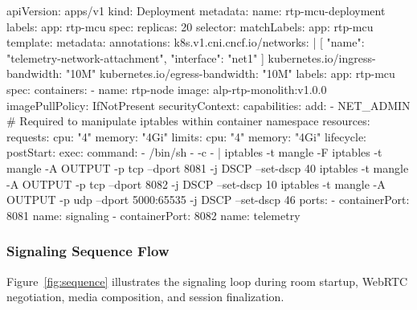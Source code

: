 \documentclass{article}
\let\originalfootnotesize\footnotesize
\let\oldverbatim\verbatim
\let\oldendverbatim\endverbatim
\renewenvironment{verbatim}{\originalfootnotesize\oldverbatim}{\oldendverbatim}
\begin{document}
\begin{verbatim}
apiVersion: apps/v1
kind: Deployment
metadata:
  name: rtp-mcu-deployment
  labels:
    app: rtp-mcu
spec:
  replicas: 20
  selector:
    matchLabels:
      app: rtp-mcu
  template:
    metadata:
      annotations:
        k8s.v1.cni.cncf.io/networks: | [{ "name": "telemetry-network-attachment", "interface": "net1" }]
        kubernetes.io/ingress-bandwidth: "10M"
        kubernetes.io/egress-bandwidth: "10M"
      labels:
        app: rtp-mcu
    spec:
      containers:
      - name: rtp-node
        image: alp-rtp-monolith:v1.0.0
        imagePullPolicy: IfNotPresent
        securityContext:
          capabilities:
            add:
            - NET_ADMIN # Required to manipulate iptables within container namespace
        resources:
          requests:
            cpu: "4"
            memory: "4Gi"
          limits:
            cpu: "4"
            memory: "4Gi"
        lifecycle:
          postStart:
            exec:
              command:
              - /bin/sh
              - -c
              - |
                iptables -t mangle -F
                iptables -t mangle -A OUTPUT -p tcp --dport 8081 -j DSCP --set-dscp 40
                iptables -t mangle -A OUTPUT -p tcp --dport 8082 -j DSCP --set-dscp 10
                iptables -t mangle -A OUTPUT -p udp --dport 5000:65535 -j DSCP --set-dscp 46
        ports:
        - containerPort: 8081
          name: signaling
        - containerPort: 8082
          name: telemetry
\end{verbatim}

\newpage
\subsubsection{Signaling Sequence Flow}

Figure~\ref{fig:sequence} illustrates the signaling loop during room startup, WebRTC negotiation,
media composition, and session finalization.
\end{document}
